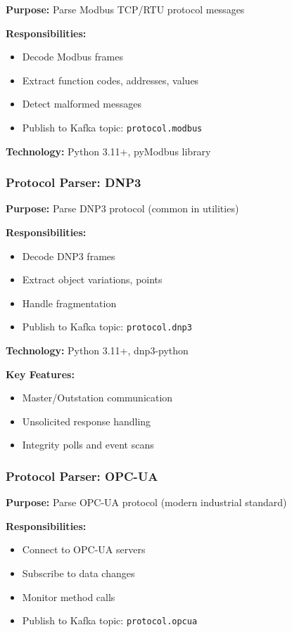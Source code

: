 \documentclass[12pt,a4paper]{article}
\begin{document}
\textbf{Purpose:} Parse Modbus TCP/RTU protocol messages

\textbf{Responsibilities:}
\begin{itemize}[leftmargin=1cm,itemsep=0pt]
    \item Decode Modbus frames
    \item Extract function codes, addresses, values
    \item Detect malformed messages
    \item Publish to Kafka topic: \texttt{protocol.modbus}
\end{itemize}

\textbf{Technology:} Python 3.11+, pyModbus library

\subsubsection{Protocol Parser: DNP3}

\textbf{Purpose:} Parse DNP3 protocol (common in utilities)

\textbf{Responsibilities:}
\begin{itemize}[leftmargin=1cm,itemsep=0pt]
    \item Decode DNP3 frames
    \item Extract object variations, points
    \item Handle fragmentation
    \item Publish to Kafka topic: \texttt{protocol.dnp3}
\end{itemize}

\textbf{Technology:} Python 3.11+, dnp3-python

\textbf{Key Features:}
\begin{itemize}[leftmargin=1cm,itemsep=0pt]
    \item Master/Outstation communication
    \item Unsolicited response handling
    \item Integrity polls and event scans
\end{itemize}


\subsubsection{Protocol Parser: OPC-UA}

\textbf{Purpose:} Parse OPC-UA protocol (modern industrial standard)

\textbf{Responsibilities:}
\begin{itemize}[leftmargin=1cm,itemsep=0pt]
    \item Connect to OPC-UA servers
    \item Subscribe to data changes
    \item Monitor method calls
    \item Publish to Kafka topic: \texttt{protocol.opcua}
\end{itemize}
\end{document}
